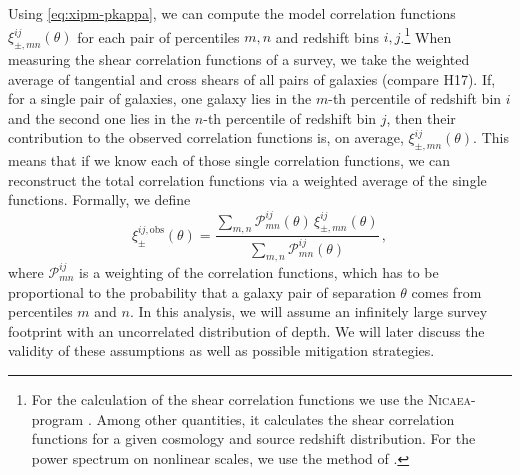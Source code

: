 \documentclass[referee]{aa} %
\renewcommand{\[}{\begin{equation}}
\renewcommand{\]}{\end{equation}}
\renewcommand{\rm}{\mathrm}
\begin{document}
Using \eqref{eq:xipm-pkappa}, we can compute the model correlation functions $\xi_{\pm,mn}^{ij}(\theta)$ for each pair of percentiles $m,n$ and redshift bins $i,j$.\footnote{For the calculation of the shear correlation functions we use the \textsc{Nicaea}-program \citep{10.1093/mnras/stx2082}. Among other quantities, it calculates the shear correlation functions for a given cosmology and source redshift distribution. For the power spectrum on nonlinear scales, we use the method of \citet{2012ApJ...761..152T}.} When measuring the shear correlation functions of a survey, we take the weighted average of tangential and cross shears of all pairs of galaxies (compare H17). If, for a single pair of galaxies, one galaxy lies in the $m$-th percentile of redshift bin $i$ and the second one lies in the $n$-th percentile of redshift bin $j$, then their contribution to the observed correlation functions is, on average, $\xi_{\pm,mn}^{ij}(\theta)$. This means that if we know each of those single correlation functions, we can reconstruct the total correlation functions via a weighted average of the single functions. Formally, we define \[
\xi_\pm^{ij,\rm{obs}}(\theta) = \frac{\sum_{m,n} \mathcal{P}_{mn}^{ij}(\theta)\,\xi_{\pm,mn}^{ij}(\theta)}{\sum_{m,n} \mathcal{P}_{mn}^{ij}(\theta)}\, ,
\label{eq:def_xiobs}
\]
where $\mathcal{P}_{mn}^{ij}$ is a weighting of the correlation functions, which has to be proportional to the probability that a galaxy pair of separation $\theta$ comes from percentiles $m$ and $n$. In this analysis, we will assume an infinitely large survey footprint with an uncorrelated distribution of depth. We will later discuss the validity of these assumptions as well as possible mitigation strategies. 
\end{document}
